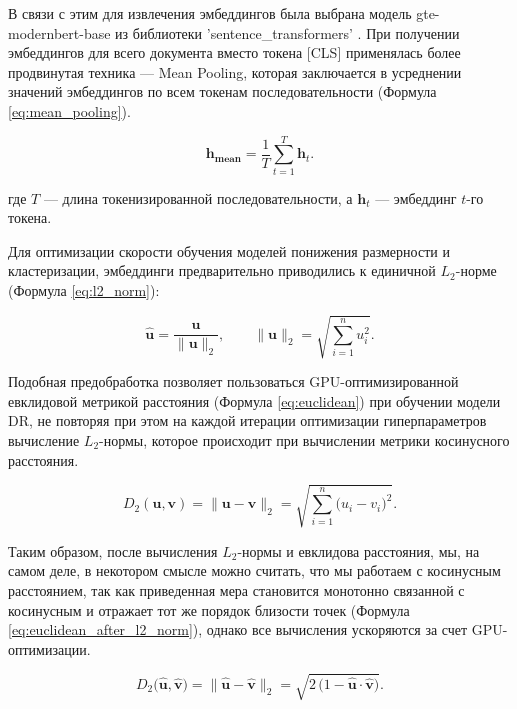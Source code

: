 В связи с этим для извлечения эмбеддингов была выбрана модель gte-modernbert-base из библиотеки 'sentence\_transformers' \parencite{SBERT2019}.
При получении эмбеддингов для всего документа вместо токена [CLS] применялась более продвинутая техника --- Mean Pooling, которая заключается
в усреднении значений эмбеддингов по всем токенам последовательности (Формула \ref{eq:mean_pooling}).

\begin{equation}\label{eq:mean_pooling}
    \mathbf{h_{mean}}=\frac{1}{T}\sum^T_{t=1}\mathbf{h}_{t}.
\end{equation}

где $T$ — длина токенизированной последовательности, а $\mathbf{h}_t$ — эмбеддинг $t$-го токена.

Для оптимизации скорости обучения моделей понижения размерности и кластеризации,
эмбеддинги предварительно приводились к единичной $L_2$-норме (Формула \ref{eq:l2_norm}):

\begin{equation}\label{eq:l2_norm}
    \widehat{\mathbf{u}}
    = \frac{\mathbf{u}}{\|\mathbf{u}\|_2},
    \qquad
    \|\mathbf{u}\|_2 = \sqrt{\sum_{i=1}^{n} u_i^2}.
\end{equation}

Подобная предобработка позволяет пользоваться GPU-оптимизированной евклидовой метрикой расстояния (Формула \ref{eq:euclidean}) при обучении модели DR,
не повторяя при этом на каждой итерации оптимизации гиперпараметров вычисление $L_2$-нормы, которое происходит при вычислении метрики косинусного расстояния.

\begin{equation}\label{eq:euclidean}
    D_{2}(\mathbf{u}, \mathbf{v})
    = \|\mathbf{u} - \mathbf{v}\|_2
    = \sqrt{\sum_{i=1}^{n} \bigl(u_i - v_i\bigr)^2}.
\end{equation}

Таким образом, после вычисления $L_2$-нормы и евклидова расстояния, мы, на самом деле, в некотором смысле можно считать, что мы работаем с косинусным расстоянием,
так как приведенная мера становится монотонно связанной с косинусным и отражает тот же порядок близости точек (Формула \ref{eq:euclidean_after_l2_norm}),
однако все вычисления ускоряются за счет GPU-оптимизации.

\begin{equation}\label{eq:euclidean_after_l2_norm}
    D_{2}\bigl(\widehat{\mathbf{u}}, \widehat{\mathbf{v}}\bigr)
    = \bigl\|\widehat{\mathbf{u}} - \widehat{\mathbf{v}}\bigr\|_2
    = \sqrt{2\,\bigl(1 - \widehat{\mathbf{u}}\!\cdot\!\widehat{\mathbf{v}}\bigr)}.
\end{equation}

